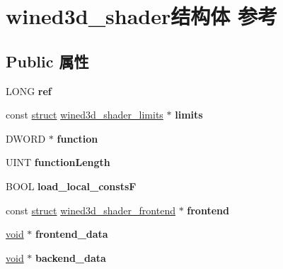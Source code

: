 \hypertarget{structwined3d__shader}{}\section{wined3d\+\_\+shader结构体 参考}
\label{structwined3d__shader}
\subsection*{Public 属性}
\begin{DoxyCompactItemize}
\item 
\mbox{\label{structwined3d__shader_ac33c99aabb7460320228057fcb4b122d}} 
L\+O\+NG {\bfseries ref}
\item 
\mbox{\label{structwined3d__shader_aa7aabfdded75b45fc7829bef42522bb9}} 
const \hyperlink{interfacestruct}{struct} \hyperlink{structwined3d__shader__limits}{wined3d\+\_\+shader\+\_\+limits} $\ast$ {\bfseries limits}
\item 
\mbox{\label{structwined3d__shader_a89f60c971b61305230387ee241c9cd50}} 
D\+W\+O\+RD $\ast$ {\bfseries function}
\item 
\mbox{\label{structwined3d__shader_ab3c9b12fb25dc4ae67e9317e4653bfb5}} 
U\+I\+NT {\bfseries function\+Length}
\item 
\mbox{\label{structwined3d__shader_a9d5894ff789eb3896231b085c100df9d}} 
B\+O\+OL {\bfseries load\+\_\+local\+\_\+constsF}
\item 
\mbox{\label{structwined3d__shader_aab6647dbdbe5384163f49e0660655219}} 
const \hyperlink{interfacestruct}{struct} \hyperlink{structwined3d__shader__frontend}{wined3d\+\_\+shader\+\_\+frontend} $\ast$ {\bfseries frontend}
\item 
\mbox{\label{structwined3d__shader_a56c7688be7f3abbf02c3b765fa03e7ec}} 
\hyperlink{interfacevoid}{void} $\ast$ {\bfseries frontend\+\_\+data}
\item 
\mbox{\label{structwined3d__shader_ae55084879bb131769226456d3e762e40}} 
\hyperlink{interfacevoid}{void} $\ast$ {\bfseries backend\+\_\+data}

\end{DoxyCompactItemize}
